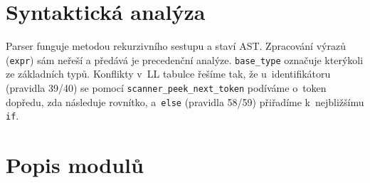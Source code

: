 \documentclass[a4paper,11pt]{article}
\begin{document}
\section{Syntaktická analýza}
Parser funguje metodou rekurzivního sestupu a staví AST. Zpracování výrazů
(\texttt{expr}) sám neřeší a předává je precedenční analýze.
\texttt{base\_type} označuje kterýkoli ze základních typů. Konflikty
v~LL tabulce řešíme tak, že u~identifikátoru (pravidla 39/40) se pomocí
\texttt{scanner\_peek\_next\_token} podíváme o~token dopředu, zda následuje
rovnítko, a~\texttt{else} (pravidla 58/59) přiřadíme k~nejbližšímu \texttt{if}.





\newpage
\section{Popis modulů}
\end{document}
